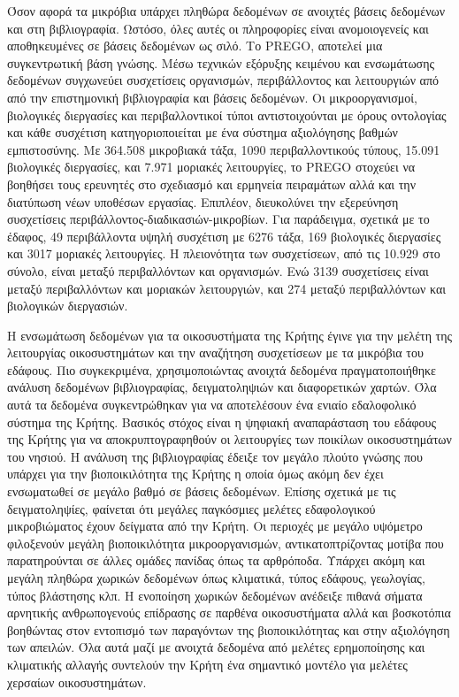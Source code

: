 \documentclass[11pt]{article}
\begin{document}
Όσον αφορά τα μικρόβια
υπάρχει πληθώρα δεδομένων σε ανοιχτές βάσεις δεδομένων και στη
βιβλιογραφία.
Ωστόσο, όλες αυτές οι πληροφορίες είναι ανομοιογενείς και αποθηκευμένες σε 
βάσεις δεδομένων ως σιλό. Το \textlatin{PREGO}, αποτελεί μια συγκεντρωτική βάση γνώσης. Μέσω
τεχνικών εξόρυξης κειμένου και ενσωμάτωσης δεδομένων συγχωνεύει 
συσχετίσεις οργανισμών, περιβάλλοντος και λειτουργιών από
από την επιστημονική βιβλιογραφία και βάσεις δεδομένων. 
Οι μικροοργανισμοί, βιολογικές διεργασίες και περιβαλλοντικοί τύποι αντιστοιχούνται
με όρους οντολογίας και κάθε συσχέτιση κατηγοριοποιείται με ένα σύστημα αξιολόγησης 
βαθμών εμπιστοσύνης.
Με 364.508 μικροβιακά τάξα, 1090 περιβαλλοντικούς τύπους, 15.091 βιολογικές διεργασίες,
και 7.971 μοριακές λειτουργίες, το \textlatin{PREGO} στοχεύει να βοηθήσει τους ερευνητές στο 
σχεδιασμό και ερμηνεία πειραμάτων αλλά και την διατύπωση νέων υποθέσων εργασίας. Επιπλέον, διευκολύνει την εξερεύνηση
συσχετίσεις περιβάλλοντος-διαδικασιών-μικροβίων.
Για παράδειγμα, σχετικά με το έδαφος, 49 περιβάλλοντα υψηλή συσχέτιση με 
6276 τάξα, 169 βιολογικές διεργασίες και 3017 μοριακές λειτουργίες.
Η πλειονότητα των συσχετίσεων, από τις 10.929 στο σύνολο, είναι μεταξύ περιβαλλόντων 
και οργανισμών. Ενώ 3139 συσχετίσεις είναι μεταξύ περιβαλλόντων και μοριακών λειτουργιών, 
και 274 μεταξύ περιβαλλόντων και βιολογικών διεργασιών.

Η ενσωμάτωση δεδομένων για τα οικοσυστήματα της Κρήτης έγινε για την μελέτη
της λειτουργίας οικοσυστημάτων και την αναζήτηση συσχετίσεων με τα 
μικρόβια του εδάφους.
Πιο συγκεκριμένα, χρησιμοποιώντας ανοιχτά δεδομένα πραγματοποιήθηκε ανάλυση 
δεδομένων βιβλιογραφίας, δειγματοληψιών και διαφορετικών χαρτών. Όλα αυτά τα δεδομένα
συγκεντρώθηκαν για να αποτελέσουν ένα ενιαίο εδαλοφολικό σύστημα της Κρήτης. 
Βασικός στόχος είναι η ψηφιακή αναπαράσταση του εδάφους της Κρήτης για να αποκρυπτογραφηθούν
οι λειτουργίες των ποικίλων οικοσυστημάτων του νησιού.
Η ανάλυση της βιβλιογραφίας έδειξε τον μεγάλο πλούτο γνώσης που υπάρχει για την 
βιοποικιλότητα της Κρήτης η οποία όμως ακόμη δεν έχει ενσωματωθεί σε μεγάλο βαθμό σε βάσεις 
δεδομένων. 
Επίσης σχετικά με τις δειγματοληψίες, φαίνεται ότι μεγάλες παγκόσμιες 
μελέτες εδαφολογικού μικροβιώματος έχουν δείγματα από την Κρήτη. 
Οι περιοχές με μεγάλο υψόμετρο φιλοξενούν μεγάλη βιοποικιλότητα
μικροοργανισμών, αντικατοπτρίζοντας μοτίβα που παρατηρούνται σε άλλες ομάδες πανίδας όπως τα αρθρόποδα.
Υπάρχει ακόμη και μεγάλη πληθώρα χωρικών δεδομένων όπως κλιματικά, 
τύπος εδάφους, γεωλογίας, τύπος βλάστησης κλπ.
Η ενοποίηση χωρικών δεδομένων ανέδειξε πιθανά σήματα αρνητικής ανθρωπογενούς επίδρασης σε παρθένα οικοσυστήματα αλλά και 
βοσκοτόπια βοηθώντας στον εντοπισμό των παραγόντων της βιοποικιλότητας και στην αξιολόγηση των απειλών.
Όλα αυτά μαζί με ανοιχτά δεδομένα από μελέτες ερημοποίησης και κλιματικής αλλαγής
συντελούν την Κρήτη ένα σημαντικό μοντέλο για μελέτες χερσαίων οικοσυστημάτων.
\end{document}
